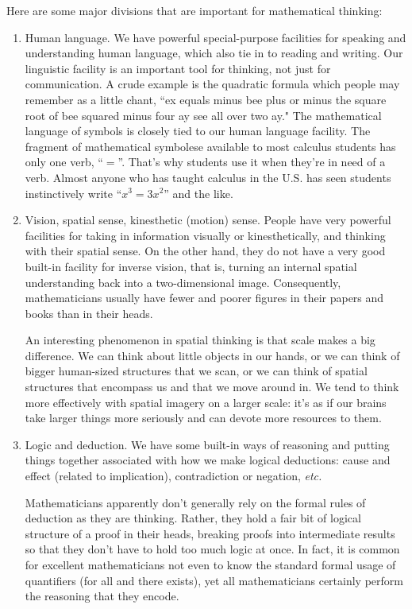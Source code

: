 \documentclass[12pt]{amsart}
\begin{document}
Here are some major divisions that are important for 
mathematical thinking: 
\begin{enumerate}
\item Human language.  We have powerful special-purpose
facilities for speaking and understanding human language, 
which also tie
in to reading and writing.  Our linguistic facility is an 
important
tool for thinking, not just for communication.  A crude
example is the quadratic formula which people may remember 
as a little chant,
``ex equals minus bee plus or minus the square root of bee 
squared
minus four ay see all over two ay."   The
mathematical language of symbols is closely tied to our 
human language facility.
The fragment of mathematical symbolese available to most 
calculus students
has only one verb, ``$=$''.  That's why students use it
when they're in need of a verb.  Almost anyone who has 
taught calculus
in the U.S. has seen students instinctively write ``$x^3 
= 3 x^2$'' and the
like.
\item  Vision, spatial sense, kinesthetic (motion) sense.
People have very powerful facilities for taking in 
information visually
or kinesthetically, and thinking with their spatial sense. 
 On the other
hand, they do not have a very good built-in facility for 
inverse vision,
that is, turning an internal spatial understanding back 
into a two-dimensional
image.  Consequently, mathematicians usually have fewer 
and poorer
figures in their papers and books than in their heads.

An interesting phenomenon in spatial thinking is that 
scale makes
a big difference.  We can think about little objects in 
our hands, or we can
think of bigger human-sized structures that we scan, or we 
can think of
spatial structures that encompass us and that we move 
around in. 
We tend to think more effectively with spatial imagery on 
a larger scale:
it's as if our brains take larger things more seriously 
and can
devote more resources to them.

\item  Logic and deduction.  We have some built-in ways of
reasoning and putting things together associated with how 
we make logical
deductions:  cause and effect (related to implication),
contradiction or negation, {\it etc.} 

Mathematicians apparently don't generally
rely on the formal rules of deduction as they are 
thinking.  Rather, they hold
a fair bit of logical structure of a proof in their heads, 
breaking 
proofs into intermediate results so that they don't have 
to hold too much 
logic at once.  In fact, it is common for excellent 
mathematicians not even to
know the standard
formal usage of quantifiers (for all and there exists), 
yet all
mathematicians certainly perform the reasoning that they 
encode.


\end{enumerate}
\end{document}

